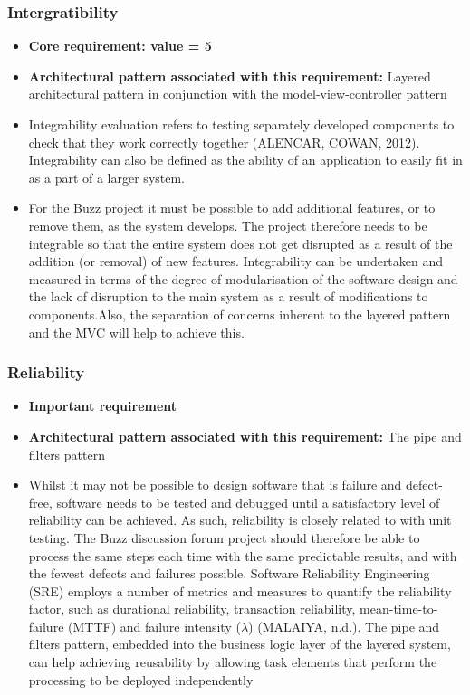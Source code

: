 \documentclass[a4paper]{article}
\begin{document}
\subsubsection{Intergratibility}
\begin{itemize}
	\item \textbf{Core requirement: value = 5}
	\item \textbf{Architectural pattern associated with this requirement:} Layered architectural pattern in conjunction with the model-view-controller pattern 
	\item Integrability evaluation refers to testing separately developed components to check that they work correctly together (ALENCAR, COWAN, 2012). Integrability can also be defined as the ability of an application to easily fit in as a part of a larger system. 
	\item For the Buzz project it must be possible to add additional features, or to remove them, as the system develops. The project therefore needs to be integrable so that the entire system does not get disrupted as a result of the addition (or removal) of new features. Integrability can be undertaken and measured in terms of the degree of modularisation
of the software design and the lack of disruption to the main system as a result of modifications to components.Also, the separation of concerns inherent to the layered pattern and the MVC will help to achieve this.
\end{itemize}



\subsubsection{Reliability}
\begin{itemize}
	\item \textbf{Important requirement}
	\item \textbf{Architectural pattern associated with this requirement:} The pipe and filters pattern 
	\item Whilst it may not be possible to design software that is failure and defect-free, software needs to be tested and debugged until a satisfactory level of reliability can be achieved. As such, reliability is closely related to with unit testing. The Buzz discussion forum project should therefore be able to process the same steps each time with the same predictable results, and with the fewest defects and failures possible. Software Reliability Engineering (SRE) employs a number of metrics and measures to quantify the reliability factor, such as durational reliability, transaction reliability, mean-time-to-failure (MTTF) and failure intensity ($\lambda$) (MALAIYA, n.d.). The pipe and filters pattern, embedded into the business logic layer of the layered system, can help achieving reusability by allowing task elements that perform the processing to be deployed independently
\end{itemize}
\end{document}
